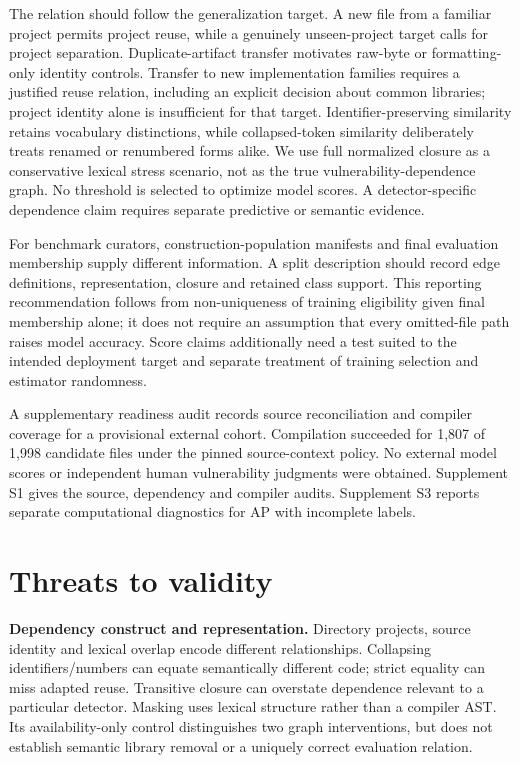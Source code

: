\documentclass[preprint,12pt]{elsarticle}
\begin{document}
The relation should follow the generalization target. A new file from a familiar project permits project reuse, while a genuinely unseen-project target calls for project separation. Duplicate-artifact transfer motivates raw-byte or formatting-only identity controls. Transfer to new implementation families requires a justified reuse relation, including an explicit decision about common libraries; project identity alone is insufficient for that target. Identifier-preserving similarity retains vocabulary distinctions, while collapsed-token similarity deliberately treats renamed or renumbered forms alike. We use full normalized closure as a conservative lexical stress scenario, not as the true vulnerability-dependence graph. No threshold is selected to optimize model scores. A detector-specific dependence claim requires separate predictive or semantic evidence.

For benchmark curators, construction-population manifests and final evaluation membership supply different information. A split description should record edge definitions, representation, closure and retained class support. This reporting recommendation follows from non-uniqueness of training eligibility given final membership alone; it does not require an assumption that every omitted-file path raises model accuracy. Score claims additionally need a test suited to the intended deployment target and separate treatment of training selection and estimator randomness.

A supplementary readiness audit records source reconciliation and compiler coverage for a provisional external cohort. Compilation succeeded for 1,807 of 1,998 candidate files under the pinned source-context policy. No external model scores or independent human vulnerability judgments were obtained. Supplement S1 gives the source, dependency and compiler audits. Supplement S3 reports separate computational diagnostics for AP with incomplete labels.

\section{Threats to validity}\label{threats-to-validity}

\textbf{Dependency construct and representation.} Directory projects, source identity and lexical overlap encode different relationships. Collapsing identifiers/numbers can equate semantically different code; strict equality can miss adapted reuse. Transitive closure can overstate dependence relevant to a particular detector. Masking uses lexical structure rather than a compiler AST. Its availability-only control distinguishes two graph interventions, but does not establish semantic library removal or a uniquely correct evaluation relation.
\end{document}
